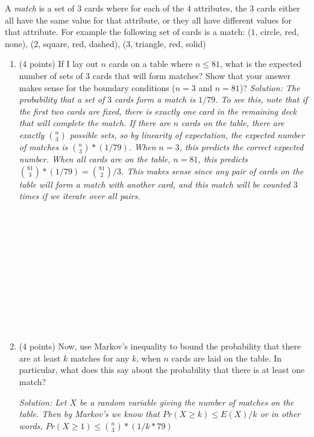 \documentclass[11pt]{article}
\newcommand{\ans}[1]{\emph{Solution: #1}}
\begin{document}
\begin{enumerate}
 A \emph{match} is a set of $3$ cards where for each of the $4$ attributes, the $3$ cards either all have the same value for that attribute, or they all have different values for that attribute.  For example the following set of cards is a match: ($1$, circle, red, none), ($2$, square, red, dashed), ($3$, triangle, red, solid)
 
 \begin{enumerate}
 \item (4 points) If I lay out $n$ cards on a table where $n \leq 81$, what is the expected number of sets of $3$ cards that will form matches?  Show that your answer makes sense for the boundary conditions ($n=3$ and $n=81$)?
 \ans{The probability that a set of $3$ cards form a match is $1/79$.  To see this, note that if the first two cards are fixed, there is exactly one card in the remaining deck that will complete the match.  If there are $n$ cards on the table, there are exactly $n \choose 3$ possible sets, so by linearity of expectation, the expected number of matches is ${n \choose 3}*(1/79)$.  When $n=3$, this predicts the correct expected number. When all cards are on the table, $n=81$, this predicts ${81 \choose 3}*(1/79) = {81 \choose 2}/3$.  This makes sense since any pair of cards on the table will form a match with another card, and this match will be counted $3$ times if we iterate over all pairs.}
  \ \\ \ \\  \ \\ \ \\ \ \\  \ \\ \ \\ \ \\  \ \\ \ \\ \ \\  \ \\

 
 \item (4 points) Now, use Markov's inequality to bound the probability that there are at least $k$ matches for any $k$, when $n$ cards are laid on the table.  In particular, what does this say about the probability that there is at least one match?
 
 \ans{Let $X$ be a random variable giving the number of matches on the table.  Then by Markov's we know that $Pr(X \geq k) \leq E(X)/k$ or in other words,  $Pr(X \geq 1) \leq {n \choose 3}*(1/k*79)$}
 
 
 \pagebreak
 

\end{enumerate}
\end{enumerate}
\end{document}
